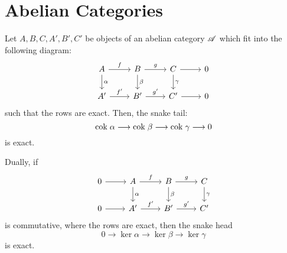 \section{Abelian Categories}

\begin{prop}
Let $A, B, C, A', B', C'$ be objects of an abelian category 
$\mathscr{A}$ which fit into the following diagram:
\[
\begin{tikzcd}
A \arrow{r}{f} \arrow{d}{\alpha} &
B \arrow{r}{g} \arrow{d}{\beta} &
C \arrow{r} \arrow{d}{\gamma} &
0 \\
A' \arrow{r}{f'} &
B' \arrow{r}{g'} &
C' \arrow{r} &
0
\end{tikzcd}
\]
such that the rows are exact. Then, the snake tail:
\[
\mathrm{cok}\; \alpha \longrightarrow \mathrm{cok}\; \beta \longrightarrow \mathrm{cok}\; \gamma \longrightarrow 0
\] 
is exact.

Dually, if
\[
\begin{tikzcd}
0 \arrow{r}&
A \arrow{r}{f} \arrow{d}{\alpha} &
B \arrow{r}{g} \arrow{d}{\beta} &
C \arrow{d}{\gamma} \\
0 \arrow{r}&
A' \arrow{r}{f'} &
B' \arrow{r}{g'} &
C' 
\end{tikzcd}
\]
is commutative, where the rows are exact, then the snake
head
\[
0 \to \ker \alpha \to \ker \beta \to \ker \gamma
\]
is exact.
\end{prop}

